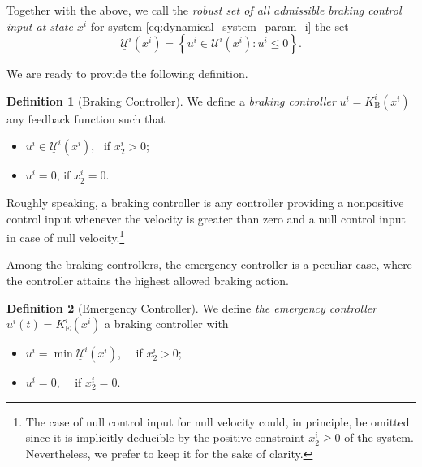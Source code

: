 \documentclass[letterpaper, 10 pt, conference]{ieeeconf}
\newcounter{Definition}
\theoremstyle{definition}
\theoremstyle{nopoint}
\newtheorem{definitionNoPoint}{Definition}
\begin{document}
Together with the above, we call the {\em robust set of all admissible braking control input at state $x^i$} for system \eqref{eq:dynamical_system_param_i} the set
\begin{equation}\label{eq:admissible_braking_inputs}
\underline{\mathcal{U}}^i(x^i)=\left\{u^i\in\mathcal{U}^i(x^i): u^i\leq 0 \right\}.
\end{equation}

We are ready to provide the following definition.
\begin{definitionNoPoint}[Braking  Controller]
We define a {\em braking  controller} $u^i= K^i_\mathrm{B}(x^i)$ any feedback function such that
\begin{itemize}
\item $u^i \in \underline{\mathcal{U}}^i(x^i)$, \, \quad if $x_2^i >0$;
\item $u^i=0$, \qquad \quad \; if $x_2^i =0$.
\end{itemize} 
\end{definitionNoPoint}


Roughly speaking, a braking controller is any controller providing a nonpositive control input whenever the velocity is greater than zero and a null control input in case of null velocity.\footnote{The case of null control input for null velocity could, in principle, be omitted since it is implicitly deducible by the positive constraint $x_2^i\geq 0$ of the system. Nevertheless, we prefer to keep it for the sake of clarity.}

Among the braking  controllers, the emergency controller is a peculiar case, where the controller attains the highest allowed braking  action.

\begin{definitionNoPoint}[Emergency Controller]\label{def:emergency_controller}
We define  {\em the emergency controller} $u^i(t)= K^i_\mathrm{E}(x^i)$ a braking  controller with
\begin{itemize}
\item $u^i = \min \underline{\mathcal{U}}^i(x^i)$, \, \, \quad if $x_2^i >0$;
\item $u^i=0$, \qquad \qquad \quad \, \, if $x_2^i =0$.
\end{itemize} 
\end{definitionNoPoint}
\end{document}
